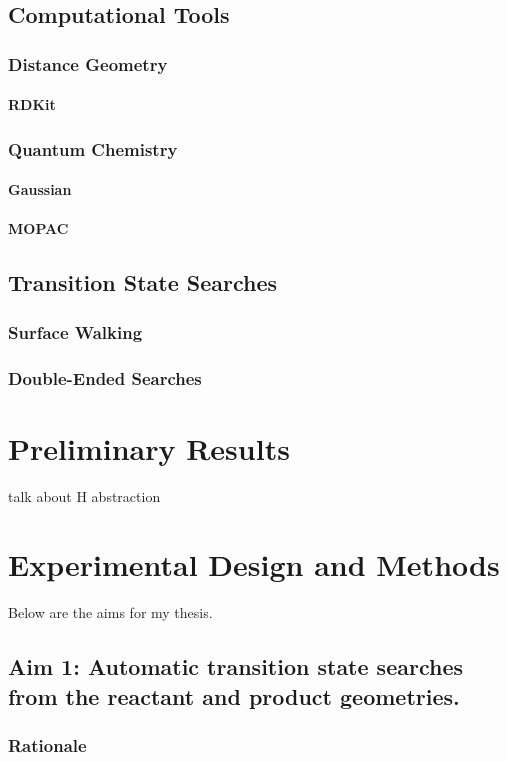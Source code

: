 \documentclass[12pt]{article}
\begin{document}
\subsection{Computational Tools}
\subsubsection{Distance Geometry}
\paragraph{RDKit}
\subsubsection{Quantum Chemistry}
\paragraph{Gaussian}
\paragraph{MOPAC}
\subsection{Transition State Searches}
\subsubsection{Surface Walking}
\subsubsection{Double-Ended Searches}
\section{Preliminary Results}
talk about H abstraction

\section{Experimental Design and Methods}

Below are the aims for my thesis.

\subsection{Aim 1: Automatic transition state searches from the reactant and product geometries.}
\subsubsection{Rationale}
\end{document}
